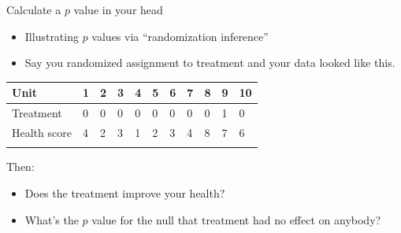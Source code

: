 \documentclass[
  11pt,
  ignorenonframetext,
]{beamer}
\providecommand{\tightlist}{%
  \setlength{\itemsep}{0pt}\setlength{\parskip}{0pt}}\usepackage{longtable,booktabs,array}
\begin{document}
\begin{frame}{Calculate a \(p\) value in your head}
\protect\hypertarget{calculate-a-p-value-in-your-head-1}{}
\begin{itemize}
\tightlist
\item
  Illustrating \(p\) values via ``randomization inference''
\item
  Say you randomized assignment to treatment and your data looked like
  this.
\end{itemize}

\begin{longtable}[]{@{}lllllllllll@{}}
\toprule\noalign{}
Unit & 1 & 2 & 3 & 4 & 5 & 6 & 7 & 8 & 9 & 10 \\
\midrule\noalign{}
\endhead
Treatment & 0 & 0 & 0 & 0 & 0 & 0 & 0 & 0 & 1 & 0 \\
Health score & 4 & 2 & 3 & 1 & 2 & 3 & 4 & 8 & 7 & 6 \\
\bottomrule\noalign{}
\end{longtable}

Then:

\begin{itemize}
\tightlist
\item
  Does the treatment improve your health?
\item
  What's the \(p\) value for the null that treatment had no effect on
  anybody?
\end{itemize}
\end{frame}
\end{document}
